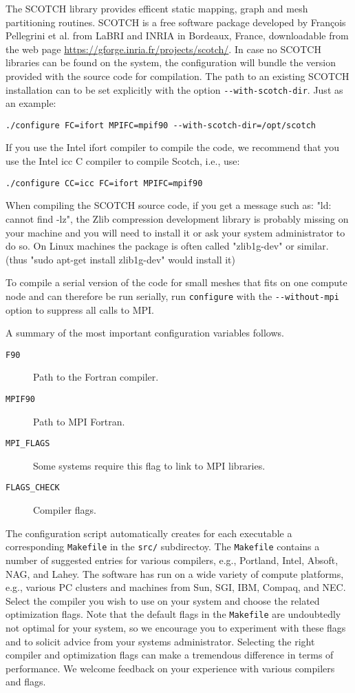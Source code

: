 The SCOTCH library \citep{PeRo96} provides efficent static mapping,
graph and mesh partitioning routines. SCOTCH is a free software package
developed by Fran\c{c}ois Pellegrini et al. from LaBRI and INRIA in Bordeaux,
France, downloadable from the web page \url{https://gforge.inria.fr/projects/scotch/}.
In case no SCOTCH libraries can be found on the system, the configuration
will bundle the version provided with the source code for compilation.
The path to an existing SCOTCH installation can to be set explicitly
with the option \texttt{-{}-with-scotch-dir}. Just as an example:
\begin{verbatim}
./configure FC=ifort MPIFC=mpif90 --with-scotch-dir=/opt/scotch
\end{verbatim}
If you use the Intel ifort compiler to compile the code, we recommend
that you use the Intel icc C compiler to compile Scotch, i.e., use:
\begin{verbatim}
./configure CC=icc FC=ifort MPIFC=mpif90
\end{verbatim}

When compiling the SCOTCH source code, if you get a message such as: "ld: cannot find -lz",
the Zlib compression development library is probably missing on your machine and you will need to install it or ask your system administrator to
do so. On Linux machines the package is often called "zlib1g-dev" or similar. (thus "sudo apt-get install zlib1g-dev" would install it)

To compile a serial version of the code for small meshes that fits
on one compute node and can therefore be run serially, run \texttt{configure}
with the \texttt{-{}-without-mpi} option to suppress all calls to
MPI.

A summary of the most important configuration variables follows.
\begin{description}
\item [{\texttt{F90}}] Path to the Fortran compiler.
\item [{\texttt{MPIF90}}] Path to MPI Fortran.
\item [{\texttt{MPI\_FLAGS}}] Some systems require this flag to link to
MPI libraries.
\item [{\texttt{FLAGS\_CHECK}}] Compiler flags.
\end{description}
The configuration script automatically creates for each executable
a corresponding \texttt{Makefile} in the \texttt{src/} subdirectoy.
The \texttt{Makefile} contains a number of suggested entries for various
compilers, e.g., Portland, Intel, Absoft, NAG, and Lahey. The software
has run on a wide variety of compute platforms, e.g., various PC clusters
and machines from Sun, SGI, IBM, Compaq, and NEC. Select the compiler
you wish to use on your system and choose the related optimization
flags. Note that the default flags in the \texttt{Makefile} are undoubtedly
not optimal for your system, so we encourage you to experiment with
these flags and to solicit advice from your systems administrator.
Selecting the right compiler and optimization flags can make a tremendous
difference in terms of performance. We welcome feedback on your experience
with various compilers and flags.

